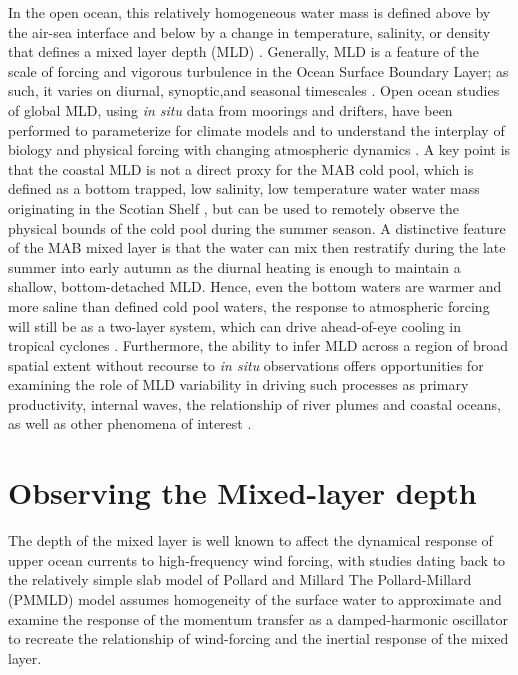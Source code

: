 \documentclass{article}
\begin{document}
In the open ocean, this relatively homogeneous water mass is defined above by the air-sea interface and below by a change in temperature, salinity, or density that defines a mixed layer depth (MLD) \cite{Thomson2003,Gerbi2009,Jeronimo2010}.
Generally, MLD is a feature of the scale of forcing and vigorous turbulence in the Ocean Surface Boundary Layer; as such, it varies on diurnal, synoptic,and seasonal timescales \cite{Sutherland2014,Glenn2016,Li2017}. 
Open ocean studies of global MLD, using \textit{in situ} data from moorings and drifters, have been performed to parameterize for climate models and to understand the interplay of biology and physical forcing with changing atmospheric dynamics \cite{Kara2000,DeBoyerMontegut2004,Sutherland2014}.
A key point is that the coastal MLD is not a direct proxy for the MAB cold pool, which is defined as a bottom trapped, low salinity, low temperature water water mass originating in the Scotian Shelf \cite{bigelow1933studies,Houghton1982,Mountain2003,Lentz2008,Zhang2014}, but can be used to remotely observe the physical bounds of the cold pool during the summer season.
A distinctive feature of the MAB mixed layer is that the water can mix then restratify during the late summer into early autumn as the diurnal heating is enough to maintain a shallow, bottom-detached MLD.
Hence, even the bottom waters are warmer and more saline than defined cold pool waters, the response to atmospheric forcing will still be as a two-layer system, which can drive ahead-of-eye cooling in tropical cyclones \cite{Lentz1992,Lentz2014,Seroka2016}. 
Furthermore, the ability to infer MLD across a region of broad spatial extent without recourse to \textit{in situ} observations offers opportunities for examining the role of MLD variability in driving such processes as primary productivity, internal waves, the relationship of river plumes and coastal oceans, as well as other phenomena of interest \cite{Flagg2006,Moum2008,Chant2012,Carvalho2017}. 

\section*{Observing the Mixed-layer depth}
The depth of the mixed layer is well known to affect the dynamical response of upper ocean currents to high-frequency wind forcing, with studies dating back to the relatively simple slab model of Pollard and Millard \cite{Pollard1970a,Pollard1970} 
The Pollard-Millard (PMMLD) model assumes homogeneity of the surface water to approximate and examine the response of the momentum transfer as a damped-harmonic oscillator to recreate the relationship of wind-forcing and the inertial response of the mixed layer. 
\end{document}
